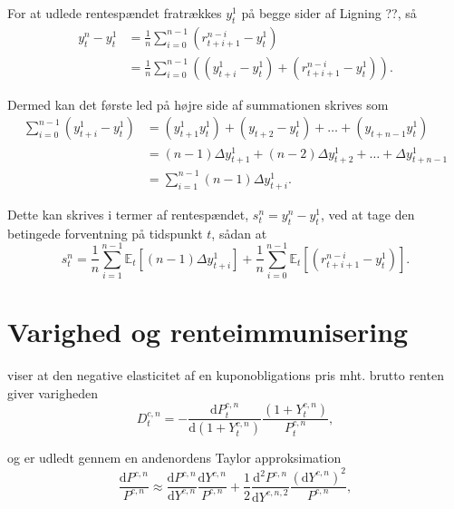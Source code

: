 \documentclass[
  a4paper,
  oneside]{memoir}
\begin{document}
For at udlede rentespændet fratrækkes \(y_t^1\) på begge sider af Ligning ??, så
\begin{align}
y_t^n-y_t^1&=\frac{1}{n} \sum_{i=0}^{n-1} \left(r_{t+i+1}^{n-i}-y_t^1\right)\\
&=\frac{1}{n} \sum_{i=0}^{n-1} \left(\left(y_{t+i}^1-y_t^1\right) + \left(r_{t+i+1}^{n-i}-y_t^1\right)\right).
\end{align}

Dermed kan det første led på højre side af summationen skrives som
\begin{align}
\sum_{i=0}^{n-1}\left(y_{t+i}^1-y_t^1\right)&=\left(y_{t+1}^1 y_t^1\right) + \left(y_{t+2}-y_t^1\right)+\dots +\left(y_{t+n-1} y_t^1\right)\\
&=\left(n-1\right)\Delta y_{t+1}^1+\left(n-2\right)\Delta y_{t+2}^1 + \dots+ \Delta y_{t+n-1}^1\\
&=\sum_{i=1}^{n-1}  \left(n-1\right)\Delta y_{t+i}^1.
\end{align}

Dette kan skrives i termer af rentespændet, \(s_t^n=y_t^n-y_t^1\), ved at tage den betingede forventning på tidspunkt \(t\), sådan at
\begin{equation}
s_t^n=\frac{1}{n} \sum_{i=1}^{n-1} \mathbb{E}_t[\left(n-1\right)\Delta y_{t+i}^1] + \frac{1}{n} \sum_{i=0}^{n-1} \mathbb{E}_t[\left(r_{t+i+1}^{n-i} - y_t^1\right)].
\end{equation}

\hypertarget{varighed-og-renteimmunisering}{%
\section{Varighed og renteimmunisering}\label{varighed-og-renteimmunisering}}

\citep{Macaulay1938} viser at den negative elasticitet af en kuponobligations pris mht. brutto renten giver varigheden
\begin{equation}
D_t^{c,n} = -\frac{\text{d} P_t^{c,n}}{\text{d}\left(1+Y_t^{c,n}\right)}\frac{\left(1+Y_t^{c,n}\right)}{P_t^{c,n}},
\end{equation}

og er udledt gennem en andenordens Taylor approksimation
\begin{equation}
\frac{\text{d} P^{c,n}}{P^{c,n}}\approx \frac{\text{d} P^{c,n}}{\text{d} Y^{c,n}}\frac{\text{d} Y^{c,n}}{P^{c,n}}+\frac{1}{2}\frac{\text{d}^2 P^{c,n}}{\text{d} Y^{c,n,2}}\frac{\left(\text{d}Y^{c,n}\right)^2}{P^{c,n}},
\end{equation}
\end{document}
